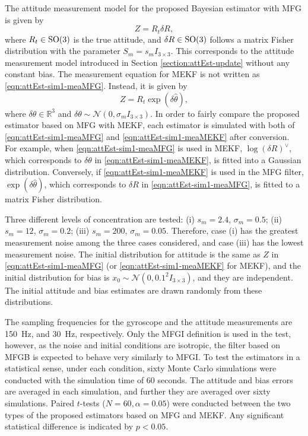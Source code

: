 The attitude measurement model for the proposed Bayesian estimator with MFG is given by
\begin{equation} \label{eqn:attEst-sim1-meaMFG}
	Z = R_t \delta R,
\end{equation}
where $R_t\in\mathrm{SO}(3)$ is the true attitude, and $\delta R\in\mathrm{SO}(3)$ follows a matrix Fisher distribution with the parameter $S_m = s_mI_{3\times 3}$.
This corresponds to the attitude measurement model introduced in Section \ref{section:attEst-update} without any constant bias.
The measurement equation for MEKF is not written as \eqref{eqn:attEst-sim1-meaMFG}. 
Instead, it is given by
\begin{equation} \label{eqn:attEst-sim1-meaMEKF}
	Z = R_t \exp(\delta\hat{\theta}),
\end{equation}
where $\delta\theta \in \mathbb{R}^3$ and $\delta\theta \sim \mathcal{N}(0,\sigma_mI_{3\times 3})$.
In order to fairly compare the proposed estimator based on MFG with MEKF, each estimator is simulated with both of \eqref{eqn:attEst-sim1-meaMFG} and \eqref{eqn:attEst-sim1-meaMEKF} after conversion. 
For example, when \eqref{eqn:attEst-sim1-meaMFG} is used in MEKF, $\log(\delta R)^\vee$, which corresponds to $\delta\theta$ in \eqref{eqn:attEst-sim1-meaMEKF}, is fitted into a Gaussian distribution.
Conversely, if \eqref{eqn:attEst-sim1-meaMEKF} is used in the MFG filter, $\exp(\delta\hat{\theta})$, which corresponds to  $\delta R$ in \eqref{eqn:attEst-sim1-meaMFG}, is fitted to a matrix Fisher distribution.

Three different levels of concentration are tested: (i) $s_m=2.4$, $\sigma_m=0.5$; (ii) $s_m=12$, $\sigma_m=0.2$; (iii) $s_m=200$, $\sigma_m=0.05$.
Therefore, case (i) has the greatest measurement noise among the three cases considered, and case (iii) has the lowest measurement noise. 
The initial distribution for attitude is the same as $Z$ in \eqref{eqn:attEst-sim1-meaMFG} (or \eqref{eqn:attEst-sim1-meaMEKF} for MEKF), and the initial distribution for bias is $x_0\sim \mathcal{N}(0,0.1^2I_{3\times3})$, and they are independent.
The initial attitude and bias estimates are drawn randomly from these distributions.

The sampling frequencies for the gyroscope and the attitude measurements are  \SI{150}{\hertz}, and \SI{30}{\hertz}, respectively.
Only the MFGI definition is used in the test, however, as the noise and initial conditions are isotropic, the filter based on MFGB is expected to behave very similarly to MFGI.
To test the estimators in a statistical sense, under each condition, sixty Monte Carlo simulations were conducted with the simulation time of 60 seconds.
The attitude and bias errors are averaged in each simulation, and further they are averaged over sixty simulations.
Paired $t$-tests ($N=60,\alpha=0.05$) were conducted between the two types of the proposed estimators based on MFG and MEKF.
Any significant statistical difference is indicated by $p<0.05$.

